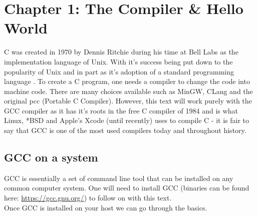 \section{Chapter 1: The Compiler \& Hello World}
C was created in 1970 by Dennis Ritchie during his time at Bell Labs as the implementation language of Unix. With it's success being put down to the popularity of Unix and in part as it's adoption of a standard programming language \cite{cHist}. To create a C program, one needs a compiler to change the code into machine code. There are many choices available such as MinGW, CLang and the original pcc (Portable C Compiler). However, this text will work purely with the GCC compiler as it has it's roots in the free C compiler of 1984 and is what Linux, *BSD and Apple's Xcode (until recently) uses to compile C - it is fair to say that GCC is one of the most used compilers today and throughout history.\\
\subsection{GCC on a system}
GCC is essentially a set of command line tool that can be installed on any common computer system. One will need to install GCC (binaries can be found here: \url{https://gcc.gnu.org/}) to follow on with this text.\\
Once GCC is installed on your host we can go through the basics.\\
